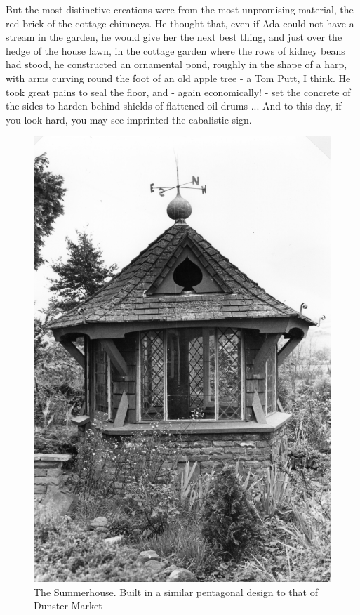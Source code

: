 But the most distinctive creations were from the most unpromising material, the red brick of the cottage chimneys. He thought that, even if Ada could not have a stream in the garden, he would give her the next best thing, and just over the hedge of the house lawn, in the cottage garden where the rows of kidney beans had stood, he constructed an ornamental pond, roughly in the shape of a harp, with arms curving round the foot of an old apple tree - a Tom Putt, I think. He took great pains to seal the floor, and - again economically! - set the concrete of the sides to harden behind shields of flattened oil drums ... And to this day, if you look hard, you may see imprinted the cabalistic sign.

\begin{figure}[]
	\centering
     \includegraphics[width=1\textwidth]{figures/Summerhouse}
     \caption{The Summerhouse. Built in a similar pentagonal design to that of Dunster Market}
     \label{fig:SummerHouse}
\end{figure}


